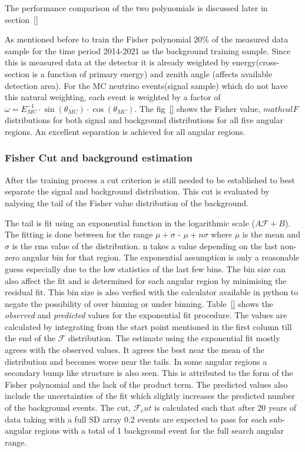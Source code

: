The performance comparison of the two polynomials is discussed later in section~\ref{}

As mentioned before to train the Fisher polynomial 20\% of the measured data sample for the time period 2014-2021 as the background training sample. Since this is measured data at the detector it is already weighted by energy(cross-section is a function of primary energy) and zenith angle (affects available detection area). For the MC neutrino events(signal sample) which do not have this natural weighting, each event is weighted by a factor of $\omega = E_{MC}^{-1} \cdot \sin(\theta_{MC}) \cdot \cos(\theta_{MC})$. The fig~\ref{} shows the Fisher value, $mathcal{F}$ distributions for both signal and background distributions for all five angular regions. An excellent separation is achieved for all angular regions. 

\subsubsection{Fisher Cut and background estimation}
\label{subsubsec:nu_sel_fisher_cut}
After the training process a cut criterion is still needed to be established to best separate the signal and background distribution. This cut is evaluated by nalysing the tail of the Fisher value distribution of the background. 

The tail is fit using an exponential function in the logarithmic scale ($A \mathcal{F} + B$). The fitting is done between for the range $\mu + \sigma$ - $\mu + n\sigma$ where $\mu$ is the mean and $\sigma$ is the rms value of the distribution. n takes a value depending on the last non-zero angular bin for that region. The exponential assumption is only a reasonable guess especially due to the low statistics of the last few bins. The bin size can also affect the fit and is determined for each angular region by minimising the residual fit. This bin size is also verfied with the calculator available in python to negate the possibility of over binning or under binning. Table~\ref{} shows the \textit{observed} and \textit{predicted} values for the exponential fit procedure. The values are calculated by integrating from the start point mentioned in the first column till the end of the $\mathcal{F}$ distribution. The estimate using the exponential fit mostly agrees with the observed values. It agrees the best near the mean of the distribution and becomes worse near the tails. In some angular regions a secondary bump like structure is also seen. This is attributed to the form of the Fisher polynomial and the lack of the product term. The predicted values also include the uncertainties of the fit which slightly increases the predicted number of the background events. The cut, $\mathcal{F}_cut$ is calculated such that after 20 years of data taking with a full SD array 0.2 events are expected to pass for each sub-angular regions with a total of 1 background event for the full search angular range. 


